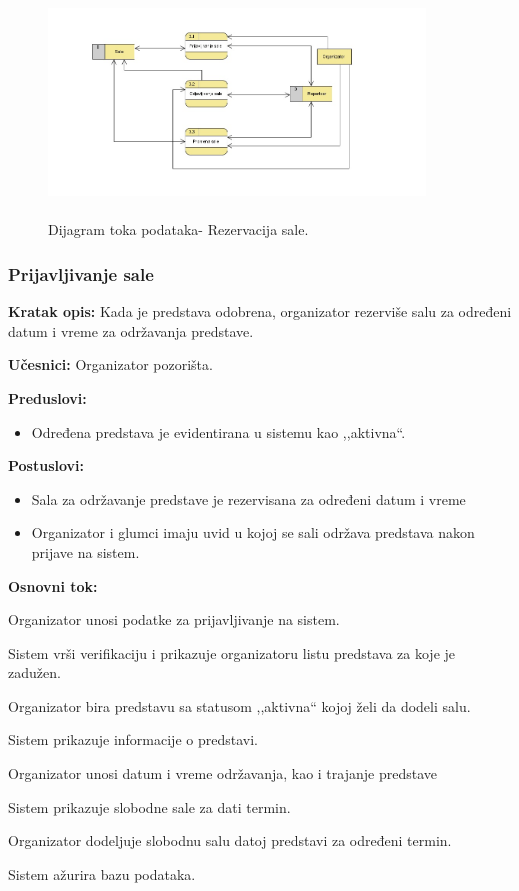 \documentclass[a4paper]{article}
\begin{document}
\begin{figure}[H]
  \begin{center}
      \includegraphics[width=100mm,height=60mm]{../images/dfd2_rezervisanje_sala.jpg}
  \end{center}
  \caption{Dijagram toka podataka- Rezervacija sale.}
  \label{dfd2_rezervisanje_sala}
\end{figure}

\subsubsection{Prijavljivanje sale}
\noindent\textbf{Kratak opis:} Kada je predstava odobrena, organizator rezerviše salu za određeni datum i vreme za održavanja predstave. 

\noindent\textbf{Učesnici:} Organizator pozorišta.

\noindent\textbf{Preduslovi:}
  \begin{itemize}
    \item Određena predstava je evidentirana u sistemu kao ,,aktivna``.
  \end{itemize}

\noindent\textbf{Postuslovi:} 
  \begin{itemize}
    \item Sala za održavanje predstave je rezervisana za određeni datum i vreme
    \item Organizator i glumci imaju uvid u kojoj se sali održava predstava nakon prijave na sistem.
  \end{itemize}

\noindent\textbf{Osnovni tok:}
  \begin{legal}
 \item Organizator unosi podatke za prijavljivanje na sistem.
    \item Sistem vrši verifikaciju i prikazuje organizatoru listu predstava za koje je zadužen.
    \item Organizator bira predstavu sa statusom ,,aktivna`` kojoj želi da dodeli salu.
    \item Sistem prikazuje informacije o predstavi.
    \item Organizator unosi datum i vreme održavanja, kao i trajanje predstave
    \item Sistem prikazuje slobodne sale za dati termin.
    \item Organizator dodeljuje slobodnu salu datoj predstavi za određeni termin.
    \item Sistem ažurira bazu podataka.
  \end{legal}
\end{document}
